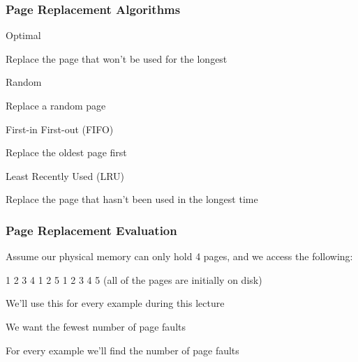   \begin{frame}
    \frametitle{Page Replacement Algorithms}

    Optimal

    \hspace{2em} Replace the page that won't be used for the longest

    \vspace{2em}

    Random

    \hspace{2em} Replace a random page

    \vspace{2em}

    First-in First-out (FIFO)

    \hspace{2em} Replace the oldest page first
    
    \vspace{2em}

    Least Recently Used (LRU)

    \hspace{2em} Replace the page that hasn't been used in the longest time
  \end{frame}

  \begin{frame}
    \frametitle{Page Replacement Evaluation}

    Assume our physical memory can only hold 4 pages, and we access the following:

    \hspace{2em} 1 2 3 4 1 2 5 1 2 3 4 5 (all of the pages are initially on disk)

    \vspace{2em}

    We'll use this for every example during this lecture

    \hspace{2em} We want the fewest number of page faults

    \vspace{2em}

    For every example we'll find the number of page faults
  \end{frame}

